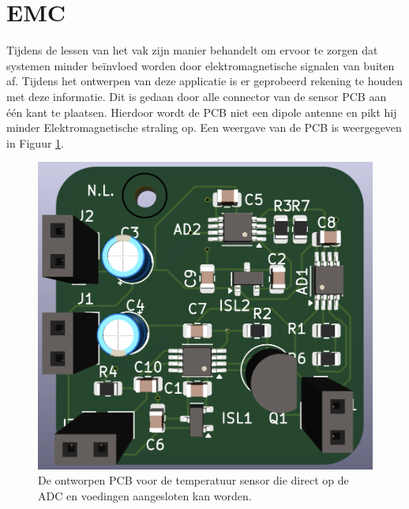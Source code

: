 \newpage
\section{EMC}
Tijdens de lessen van het vak zijn manier behandelt om ervoor te zorgen dat systemen minder beïnvloed worden door elektromagnetische signalen van buiten af. Tijdens het ontwerpen van deze applicatie is er geprobeerd rekening te houden met deze informatie. Dit is gedaan door alle connector van de sensor PCB aan één kant te plaatsen. Hierdoor wordt de PCB niet een dipole antenne en pikt hij minder Elektromagnetische straling op. Een weergave van de PCB is weergegeven in Figuur \ref{fig:PCB_render}.
\begin{figure}[H]
    \centering
    \includegraphics[width=0.75\linewidth]{pictures/pcb_render.png}
    \caption{De ontworpen PCB voor de temperatuur sensor die direct op de ADC en voedingen aangesloten kan worden.}
    \label{fig:PCB_render}
\end{figure}